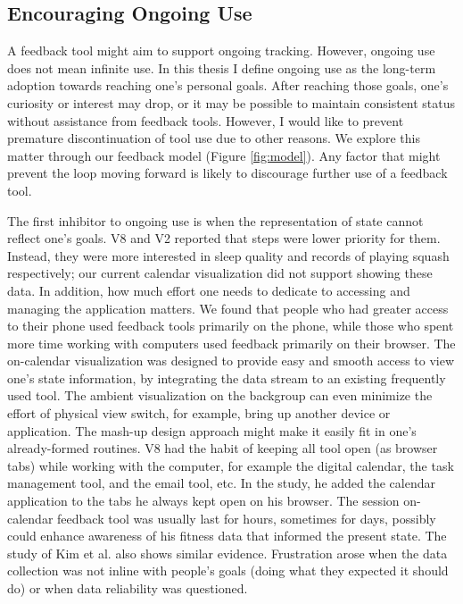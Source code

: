 \documentclass[12pt,oneside]{book}
\begin{document}
 \subsection{Encouraging Ongoing Use}
 A feedback tool might aim to support ongoing tracking. However, ongoing use does not mean infinite use. In this thesis I define ongoing use as the long-term adoption towards reaching one's personal goals. After reaching those goals, one's curiosity or interest may drop, or it may be possible to maintain consistent status without assistance from feedback tools. However, I would like to prevent premature discontinuation of tool use due to other reasons. We explore this matter through our feedback model (Figure \ref{fig:model}). Any factor that might prevent the loop moving forward is likely to discourage further use of a feedback tool. 

The first inhibitor to ongoing use is when the representation of state cannot reflect one's goals. V8 and V2 reported that steps were lower priority for them. Instead, they were more interested in sleep quality and records of playing squash respectively; our current calendar visualization did not support showing these data. In addition, how much effort one needs to dedicate to accessing and managing the application matters. We found that people who had greater access to their phone used feedback tools primarily on the phone, while those who spent more time working with computers used feedback primarily on their browser. The on-calendar visualization was designed to provide easy and smooth access to view one's state information, by integrating the data stream to an existing frequently used tool. The ambient visualization on the backgroup can even minimize the effort of physical view switch, for example, bring up another device or application. The mash-up design approach might make it easily fit in one's already-formed routines. V8 had the habit of keeping all tool open (as browser tabs) while working with the computer, for example the digital calendar, the task management tool, and the email tool, etc.  In the study, he added the calendar application to the tabs he always kept open on his browser. The session on-calendar feedback tool was usually last for hours, sometimes for days, possibly could enhance awareness of his fitness data that informed the present state. The study of Kim et al. \cite{kim_design_2016} also shows similar evidence. Frustration arose when the data collection was not inline with people's goals (doing what they expected it should do) or when data reliability was questioned.
\end{document}
